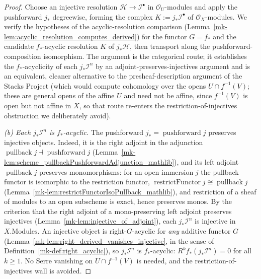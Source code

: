 \begin{proof}
  \leanok
    Choose an injective resolution \(\mathcal{H} \to \mathcal{I}^\bullet\) in
  \(\mathcal{O}_U\)-modules and apply the pushforward \(j_*\) degreewise, forming the complex
  \(K := j_*\mathcal{I}^\bullet\) of \(\mathcal{O}_X\)-modules. We verify the hypotheses of the
  acyclic-resolution comparison (Lemma~\ref{mk-lem:acyclic_resolution_computes_derived}) for the
  functor \(G = f_*\) and the candidate \(f_*\)-acyclic resolution \(K\) of \(j_*\mathcal{H}\), then
  transport along the pushforward-composition isomorphism. The argument is the
  categorical route; it establishes the \(f_*\)-acyclicity of each
  \(j_*\mathcal{I}^n\) by an adjoint-preserves-injectives argument and is an equivalent, cleaner
  alternative to the presheaf-description argument of the Stacks Project (which would compute
  cohomology over the opens \(U \cap f^{-1}(V)\); these are general opens of the affine \(U\) and
  need not be affine, since \(f^{-1}(V)\) is open but not affine in \(X\), so that route re-enters
  the restriction-of-injectives obstruction we deliberately avoid).

  \emph{(b) Each \(j_*\mathcal{I}^n\) is \(f_*\)-acyclic.} The pushforward
  \(j_* = \operatorname{pushforward} j\) preserves injective objects. Indeed, it is the right
  adjoint in the adjunction \(\operatorname{pullback} j \dashv \operatorname{pushforward} j\)
  (Lemma~\ref{mk-lem:scheme_pullbackPushforwardAdjunction_mathlib}), and its left adjoint
  \(\operatorname{pullback} j\) preserves monomorphisms: for an open immersion \(j\) the pullback
  functor is isomorphic to the restriction functor,
  \(\operatorname{restrictFunctor} j \cong \operatorname{pullback} j\)
  (Lemma~\ref{mk-lem:restrictFunctorIsoPullback_mathlib}), and restriction of a sheaf of modules to an
  open subscheme is exact, hence preserves monos. By the criterion that the right adjoint of a
  mono-preserving left adjoint preserves injectives (Lemma~\ref{mk-lem:injective_of_adjoint}), each
  \(j_*\mathcal{I}^n\) is injective in \(X.\mathrm{Modules}\). An injective object is
  right-\(G\)-acyclic for \emph{any} additive functor \(G\)
  (Lemma~\ref{mk-lem:right_derived_vanishes_injective}, in the sense of
  Definition~\ref{mk-def:right_acyclic}), so \(j_*\mathcal{I}^n\) is \(f_*\)-acyclic:
  \(R^k f_*(j_*\mathcal{I}^n) = 0\) for all \(k \geq 1\). No Serre vanishing on
  \(U \cap f^{-1}(V)\) is needed, and the restriction-of-injectives wall is avoided.


\end{proof}
